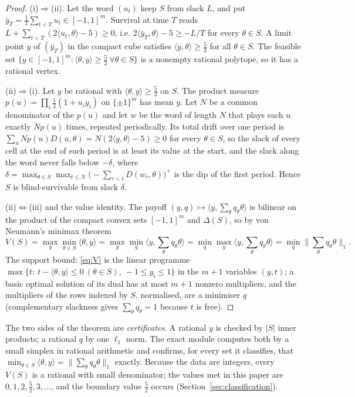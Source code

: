 \documentclass[11pt,a4paper]{article}
\theoremstyle{plain}
\theoremstyle{definition}
\theoremstyle{remark}
\newcommand{\tfr}[2]{\tfrac{#1}{#2}}
\begin{document}
\begin{proof}
(i)$\Rightarrow$(ii). Let the word $(u_t)$ keep $S$ from slack $L$, and put $\bar y_T=\tfr1T\sum_{t<T}u_t\in[-1,1]^m$. Survival at time $T$ reads $L+\sum_{t<T}(2\langle u_t,\theta\rangle-5)\ge0$, i.e. $2\langle\bar y_T,\theta\rangle-5\ge-L/T$ for every $\theta\in S$. A limit point $y$ of $(\bar y_T)$ in the compact cube satisfies $\langle y,\theta\rangle\ge\tfr52$ for all $\theta\in S$. The feasible set $\{y\in[-1,1]^m:\langle\theta,y\rangle\ge\tfr52\ \forall\theta\in S\}$ is a nonempty rational polytope, so it has a rational vertex.

(ii)$\Rightarrow$(i). Let $y$ be rational with $\langle\theta,y\rangle\ge\tfr52$ on $S$. The product measure $p(u)=\prod_{i}\tfr12(1+u_iy_i)$ on $\{\pm1\}^m$ has mean $y$. Let $N$ be a common denominator of the $p(u)$ and let $w$ be the word of length $N$ that plays each $u$ exactly $Np(u)$ times, repeated periodically. Its total drift over one period is $\sum_uNp(u)D(u,\theta)=N(2\langle y,\theta\rangle-5)\ge0$ for every $\theta\in S$, so the slack of every cell at the end of each period is at least its value at the start, and the slack along the word never falls below $-\delta$, where $\delta=\max_{\theta\in S}\max_{t\le N}\big(-\sum_{\tau<t}D(w_\tau,\theta)\big)^+$ is the dip of the first period. Hence $S$ is blind-survivable from slack $\delta$.

(ii)$\Leftrightarrow$(iii) and the value identity. The payoff $(y,q)\mapsto\langle y,\sum_\theta q_\theta\theta\rangle$ is bilinear on the product of the compact convex sets $[-1,1]^m$ and $\Delta(S)$, so by von Neumann's minimax theorem \cite{vonNeumann1928}
\[V(S)=\max_y\min_{\theta\in S}\langle\theta,y\rangle=\max_y\min_q\Big\langle y,\sum_\theta q_\theta\theta\Big\rangle=\min_q\max_y\Big\langle y,\sum_\theta q_\theta\theta\Big\rangle=\min_q\Big\|\sum_\theta q_\theta\theta\Big\|_1 .\]
The support bound: \eqref{eq:V} is the linear programme $\max\{t:\ t-\langle\theta,y\rangle\le0\ (\theta\in S),\ -1\le y_i\le1\}$ in the $m+1$ variables $(y,t)$; a basic optimal solution of its dual has at most $m+1$ nonzero multipliers, and the multipliers of the rows indexed by $S$, normalised, are a minimiser $q$ (complementary slackness gives $\sum_\theta q_\theta=1$ because $t$ is free).
\end{proof}

The two sides of the theorem are \emph{certificates}. A rational $y$ is checked by $|S|$ inner products; a rational $q$ by one $\ell_1$ norm. The exact module computes both by a small simplex in rational arithmetic and confirms, for every set it classifies, that $\min_{\theta\in S}\langle\theta,y\rangle=\|\sum_\theta q_\theta\theta\|_1$ exactly. Because the data are integers, every $V(S)$ is a rational with small denominator; the values met in this paper are $0,1,2,\tfr52,3,\dots$, and the boundary value $\tfr52$ occurs (Section~\ref{sec:classification}).
\end{document}
